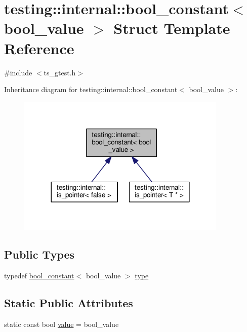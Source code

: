 \hypertarget{structtesting_1_1internal_1_1bool__constant}{\section{testing\-:\-:internal\-:\-:bool\-\_\-constant$<$ bool\-\_\-value $>$ Struct Template Reference}
\label{structtesting_1_1internal_1_1bool__constant}
}


{\ttfamily \#include $<$ts\-\_\-gtest.\-h$>$}



Inheritance diagram for testing\-:\-:internal\-:\-:bool\-\_\-constant$<$ bool\-\_\-value $>$\-:\nopagebreak
\begin{figure}[H]
\begin{center}
\leavevmode
\includegraphics[width=284pt]{structtesting_1_1internal_1_1bool__constant__inherit__graph}
\end{center}
\end{figure}
\subsection*{Public Types}
\begin{DoxyCompactItemize}
\item 
typedef \hyperlink{structtesting_1_1internal_1_1bool__constant}{bool\-\_\-constant}$<$ bool\-\_\-value $>$ \hyperlink{structtesting_1_1internal_1_1bool__constant_aba6d09ecf7eecea6c93480f0d627a167}{type}
\end{DoxyCompactItemize}
\subsection*{Static Public Attributes}
\begin{DoxyCompactItemize}
\item 
static const bool \hyperlink{structtesting_1_1internal_1_1bool__constant_a499fba6576296b04d99690a486424b32}{value} = bool\-\_\-value
\end{DoxyCompactItemize}


